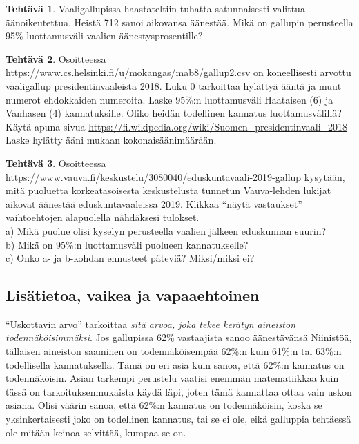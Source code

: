 \documentclass[12pt,leqno,a4paper,oneside]{amsart}
\theoremstyle{definition}
\newtheorem{exercise}{Tehtävä}
\theoremstyle{remark}
\numberwithin{equation}{section}
\begin{document}
\begin{exercise}
 Vaaligallupissa haastateltiin tuhatta satunnaisesti valittua äänoikeutettua. Heistä 712 sanoi aikovansa äänestää.
 Mikä on gallupin perusteella 95\% luottamusväli
 vaalien äänestysprosentille?
\end{exercise}

\begin{exercise}
 Osoitteessa \url{https://www.cs.helsinki.fi/u/mokangas/mab8/gallup2.csv} on koneellisesti arvottu vaaligallup presidentinvaaleista 2018.
 Luku 0 tarkoittaa hylättyä ääntä ja muut numerot ehdokkaiden numeroita. Laske 95\%:n luottamusväli Haataisen (6) ja Vanhasen (4) kannatuksille. 
 Oliko heidän todellinen kannatus luottamusvälillä? Käytä apuna sivua \url{https://fi.wikipedia.org/wiki/Suomen_presidentinvaali_2018} 
 Laske hylätty ääni mukaan kokonaisäänimäärään.
\end{exercise}


\begin{exercise}
 Osoitteessa \url{https://www.vauva.fi/keskustelu/3080040/eduskuntavaali-2019-gallup} kysytään, mitä puoluetta 
 korkea\-tasoi\-ses\-ta keskustelusta tunnetun Vauva-lehden lukijat aikovat äänestää eduskuntavaaleissa 2019.
 Klikkaa ``näytä vastaukset'' vaihtoehtojen alapuolella nähdäksesi tulokset.\\
 a) Mikä puolue olisi kyselyn perusteella vaalien jälkeen eduskunnan suurin?\\
 b) Mikä on 95\%:n luottamusväli puolueen kannatukselle?\\
 c) Onko a- ja b-kohdan ennusteet päteviä? Miksi/miksi ei?
\end{exercise}



\subsection{Lisätietoa, vaikea ja vapaaehtoinen}
\label{tt-lisatietoa}

``Uskottavin arvo'' tarkoittaa \emph{sitä arvoa, joka tekee kerätyn aineiston
todennäköisimmäksi}. Jos gallupissa 62\% vastaajista sanoo äänestävänsä Niinistöä, tällaisen aineiston saaminen on todennäköisempää 62\%:n kuin
61\%:n tai 63\%:n todellisella kannatuksella. Tämä on eri asia kuin sanoa, että 62\%:n kannatus on todennäköisin. Asian tarkempi perustelu vaatisi
enemmän matematiikkaa kuin tässä on tarkoituksenmukaista käydä läpi, joten tämä kannattaa ottaa vain uskon asiana. Olisi väärin sanoa, että
62\%:n kannatus on todennäköisin, koska se yksinkertaisesti joko on todellinen kannatus, tai se ei ole, eikä galluppia tehtäessä ole mitään keinoa
selvittää, kumpaa se on.
\end{document}
